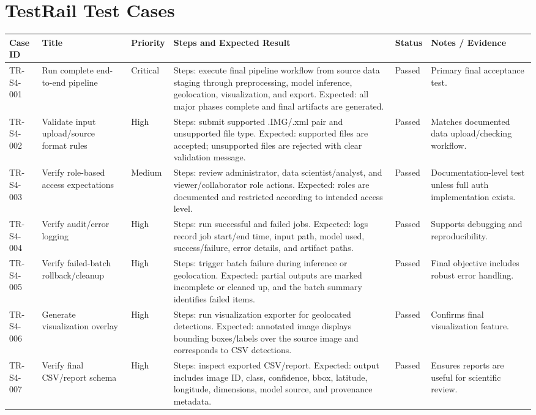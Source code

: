 \documentclass[11pt,landscape]{article}
\begin{document}
\section*{TestRail Test Cases}
\scriptsize
\begin{longtable}{p{0.75in}p{1.55in}p{0.65in}p{4.05in}p{0.65in}p{1.35in}}\toprule
\textbf{Case ID} & \textbf{Title} & \textbf{Priority} & \textbf{Steps and Expected Result} & \textbf{Status} & \textbf{Notes / Evidence}\\\midrule\endhead
TR-S4-001 & Run complete end-to-end pipeline & Critical & Steps: execute final pipeline workflow from source data staging through preprocessing, model inference, geolocation, visualization, and export. Expected: all major phases complete and final artifacts are generated. & Passed & Primary final acceptance test. \\
TR-S4-002 & Validate input upload/source format rules & High & Steps: submit supported .IMG/.xml pair and unsupported file type. Expected: supported files are accepted; unsupported files are rejected with clear validation message. & Passed & Matches documented data upload/checking workflow. \\
TR-S4-003 & Verify role-based access expectations & Medium & Steps: review administrator, data scientist/analyst, and viewer/collaborator role actions. Expected: roles are documented and restricted according to intended access level. & Passed & Documentation-level test unless full auth implementation exists. \\
TR-S4-004 & Verify audit/error logging & High & Steps: run successful and failed jobs. Expected: logs record job start/end time, input path, model used, success/failure, error details, and artifact paths. & Passed & Supports debugging and reproducibility. \\
TR-S4-005 & Verify failed-batch rollback/cleanup & High & Steps: trigger batch failure during inference or geolocation. Expected: partial outputs are marked incomplete or cleaned up, and the batch summary identifies failed items. & Passed & Final objective includes robust error handling. \\
TR-S4-006 & Generate visualization overlay & High & Steps: run visualization exporter for geolocated detections. Expected: annotated image displays bounding boxes/labels over the source image and corresponds to CSV detections. & Passed & Confirms final visualization feature. \\
TR-S4-007 & Verify final CSV/report schema & High & Steps: inspect exported CSV/report. Expected: output includes image ID, class, confidence, bbox, latitude, longitude, dimensions, model source, and provenance metadata. & Passed & Ensures reports are useful for scientific review. \\

\end{longtable}
\end{document}
